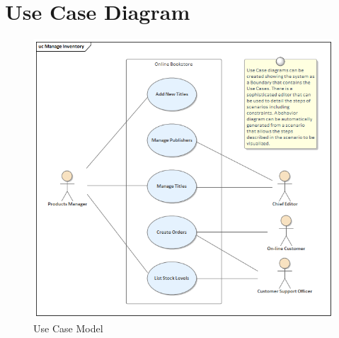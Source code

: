 	\section{Use Case Diagram}
\begin{figure}[h]
	\centering
	\includegraphics[width=1\textwidth]{usecase.png} 
	\caption{Use Case Model}
	\label{fig:Use Case Model}
\end{figure}

